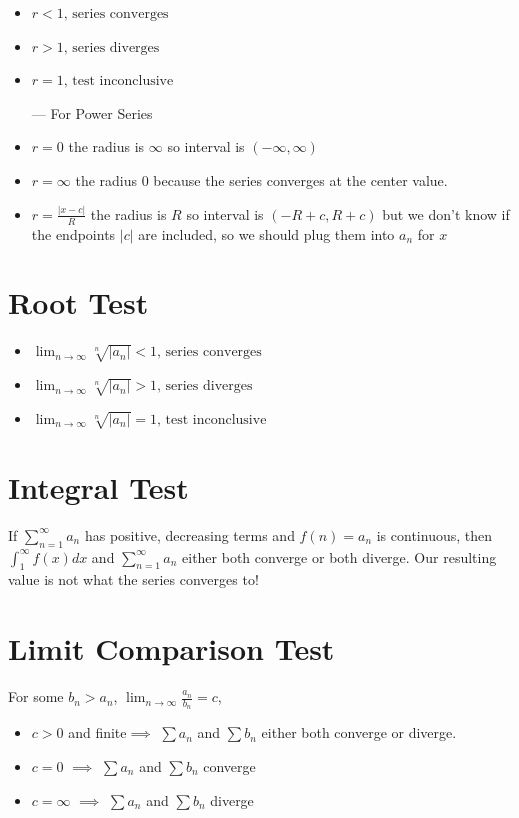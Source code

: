 \documentclass[12pt]{article}
\begin{document}
\begin{itemize}
    \item $r < 1 \text{, series converges}$
    \item $r > 1 \text{, series diverges}$
    \item $r = 1 \text{, test inconclusive}$

    ---
    For Power Series

    \item $r = 0$ the radius is $\infty$ so interval is  $(-\infty, \infty)$
    \item $r = \infty$ the radius $0$ because the series converges at the center value.
    \item $r = \frac{|x-c|}{R}$ the radius is $R$ so interval is  $(-R+c, R+c)$ but we don't know if the endpoints $|c|$ are included, so we should plug them into $a_n$ for $x$

\end{itemize}

\section{Root Test}
\begin{itemize}
    \item $\lim_{n\to\infty} \sqrt[n]{|a_n|} < 1 \text{, series converges}$
    \item $\lim_{n\to\infty} 
    \sqrt[n]{|a_n|} > 1 \text{, series diverges}$
    \item $\lim_{n\to\infty} \sqrt[n]{|a_n|}  = 1 \text{, test inconclusive}$
\end{itemize}


\section{Integral Test}
If $\sum_{n=1}^\infty a_n$ has positive, decreasing terms and $f(n) = a_n$ is continuous, then $\int_1^\infty f(x) dx$ and $\sum_{n=1}^\infty a_n$ either both converge or both diverge. Our resulting value is not what the series converges to!

\section{Limit Comparison Test}For some $b_n > a_n$,  $\lim_{n\to\infty} \frac{a_n}{b_n} = c$, 

\begin{itemize}
    \item $c>0$ and finite$\implies$ $\sum a_n$ and $\sum b_n$ either both converge or diverge.
    \item $c=0$ $\implies$ $\sum a_n$ and $\sum b_n$ converge
    \item $c=\infty$ $\implies$ $\sum a_n$ and $\sum b_n$ diverge
\end{itemize}
\end{document}
